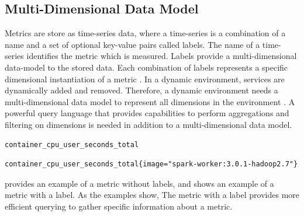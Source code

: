 \subsection{Multi-Dimensional Data Model}
\label{subsec:02_monitoring_db_multi-model}
Metrics are store as time-series data, where a time-series is a combination of a name and a set of optional key-value pairs called labels.
The name of a time-series identifies the metric which is measured.
Labels provide a multi-dimensional data-model to the stored data. Each combination of labels represents a specific dimensional instantiation of a metric \cite{Prom2020Docs}.
In a dynamic environment, services are dynamically added and removed. Therefore, a dynamic environment needs a multi-dimensional data model to represent all dimensions in the environment \cite{Farcic2018Toolkit22}.
A powerful query language that provides capabilities to perform aggregations and filtering on dimensions is needed in addition to a multi-dimensional data model.
\begin{lstlisting}[label=lst:02_monitoring_db_multi-model_metr_dimless, caption=Example of a dimensionless-metric, numbers=none]
container_cpu_user_seconds_total
\end{lstlisting}
\begin{lstlisting}[label=lst:02_monitoring_db_multi-model_metr_withdim, caption=Example of a metric with dimensions, numbers=none]
container_cpu_user_seconds_total{image="spark-worker:3.0.1-hadoop2.7"}
\end{lstlisting}
 provides an example of a metric without labels, and  shows an example of a metric with a label. As the examples show, The metric with a label provides more efficient querying to gather specific information about a metric.
